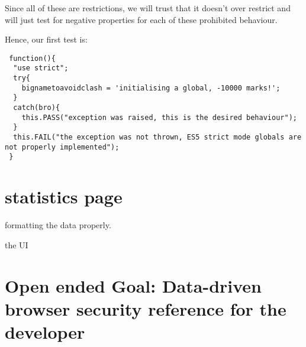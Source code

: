 Since all of these are restrictions, we will trust that it doesn't over restrict and will just test for negative properties for each of these prohibited behaviour.\

Hence, our first test is:

\begin{verbatim}
 function(){
  "use strict";
  try{
    bignametoavoidclash = 'initialising a global, -10000 marks!';
  }
  catch(bro){
    this.PASS("exception was raised, this is the desired behaviour");
  }
  this.FAIL("the exception was not thrown, ES5 strict mode globals are not properly implemented");
 }
\end{verbatim}

\section{statistics page}

formatting the data properly.


the UI 


\section{Open ended Goal: Data-driven browser security reference for the developer }